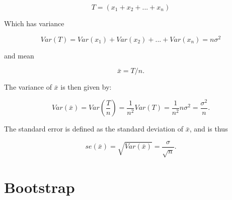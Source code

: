 \documentclass[
  letterpaper,
  DIV=11,
  numbers=noendperiod]{scrreprt}
\begin{document}
\[
T = (x_1 + x_2 + ... + x_n)
\]

Which has variance

\[
Var(T) = Var(x_1) + Var(x_2) + ... + Var(x_n) = n\sigma^2\]

and mean

\[
\bar{x} = T/n.
\]

The variance of \(\bar{x}\) is then given by:

\[
Var(\bar{x}) = Var\left(\frac{T}{n}\right) = \frac{1}{n^2}Var(T) = \frac{1}{n^2}n\sigma^2 = \frac{\sigma^2}{n}.
\]

The standard error is defined as the standard deviation of \(\bar{x}\),
and is thus

\[
se(\bar{x}) = \sqrt{Var(\bar{x})} = \frac{\sigma}{\sqrt{n}}.
\]

\hypertarget{bootstrap}{%
\section{Bootstrap}\label{bootstrap}}
\end{document}
